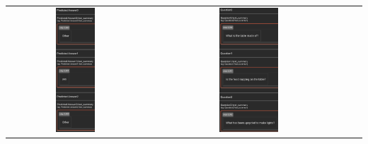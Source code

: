 \documentclass{article}
\begin{document}
\begin{tabular}{ccc}
    \includegraphics[width=0.3\textwidth]{q2.6_9.png} &
    \includegraphics[width=0.3\textwidth]{q2.6_10.png} \\
\end{tabular}
\end{document}
